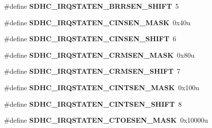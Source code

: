 \begin{DoxyCompactItemize}
\item 
\#define {\bfseries S\+D\+H\+C\+\_\+\+I\+R\+Q\+S\+T\+A\+T\+E\+N\+\_\+\+B\+R\+R\+S\+E\+N\+\_\+\+S\+H\+I\+FT}~5\hypertarget{group__SDHC__Register__Masks_ga994be2975fe8bfcfa36b677c8857764a}{}\label{group__SDHC__Register__Masks_ga994be2975fe8bfcfa36b677c8857764a}

\item 
\#define {\bfseries S\+D\+H\+C\+\_\+\+I\+R\+Q\+S\+T\+A\+T\+E\+N\+\_\+\+C\+I\+N\+S\+E\+N\+\_\+\+M\+A\+SK}~0x40u\hypertarget{group__SDHC__Register__Masks_ga28f8bc13ff1f5a489e41a54dc39e3152}{}\label{group__SDHC__Register__Masks_ga28f8bc13ff1f5a489e41a54dc39e3152}

\item 
\#define {\bfseries S\+D\+H\+C\+\_\+\+I\+R\+Q\+S\+T\+A\+T\+E\+N\+\_\+\+C\+I\+N\+S\+E\+N\+\_\+\+S\+H\+I\+FT}~6\hypertarget{group__SDHC__Register__Masks_gad0123206a003e799cb7aa8523ecd405c}{}\label{group__SDHC__Register__Masks_gad0123206a003e799cb7aa8523ecd405c}

\item 
\#define {\bfseries S\+D\+H\+C\+\_\+\+I\+R\+Q\+S\+T\+A\+T\+E\+N\+\_\+\+C\+R\+M\+S\+E\+N\+\_\+\+M\+A\+SK}~0x80u\hypertarget{group__SDHC__Register__Masks_ga14f097ed92b561c75e3dacc1bdefbbe2}{}\label{group__SDHC__Register__Masks_ga14f097ed92b561c75e3dacc1bdefbbe2}

\item 
\#define {\bfseries S\+D\+H\+C\+\_\+\+I\+R\+Q\+S\+T\+A\+T\+E\+N\+\_\+\+C\+R\+M\+S\+E\+N\+\_\+\+S\+H\+I\+FT}~7\hypertarget{group__SDHC__Register__Masks_ga0e48bc8d0c2f0c10d6daf191c92557a5}{}\label{group__SDHC__Register__Masks_ga0e48bc8d0c2f0c10d6daf191c92557a5}

\item 
\#define {\bfseries S\+D\+H\+C\+\_\+\+I\+R\+Q\+S\+T\+A\+T\+E\+N\+\_\+\+C\+I\+N\+T\+S\+E\+N\+\_\+\+M\+A\+SK}~0x100u\hypertarget{group__SDHC__Register__Masks_ga69074c27b92cbce82403e14f1e5a1560}{}\label{group__SDHC__Register__Masks_ga69074c27b92cbce82403e14f1e5a1560}

\item 
\#define {\bfseries S\+D\+H\+C\+\_\+\+I\+R\+Q\+S\+T\+A\+T\+E\+N\+\_\+\+C\+I\+N\+T\+S\+E\+N\+\_\+\+S\+H\+I\+FT}~8\hypertarget{group__SDHC__Register__Masks_gaa1112928a54703734f7cdc45ae77b56f}{}\label{group__SDHC__Register__Masks_gaa1112928a54703734f7cdc45ae77b56f}

\item 
\#define {\bfseries S\+D\+H\+C\+\_\+\+I\+R\+Q\+S\+T\+A\+T\+E\+N\+\_\+\+C\+T\+O\+E\+S\+E\+N\+\_\+\+M\+A\+SK}~0x10000u\hypertarget{group__SDHC__Register__Masks_ga672bdead3330e451e5e34d9f3a707504}{}\label{group__SDHC__Register__Masks_ga672bdead3330e451e5e34d9f3a707504}


\end{DoxyCompactItemize}
